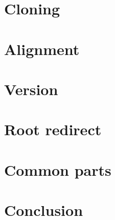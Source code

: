\documentclass[../../main.tex]{subfiles}
\begin{document}
\section{Cloning}


\section{Alignment}


\section{Version}


\section{Root redirect}


\section{Common parts}


\section{Conclusion}

\end{document}
